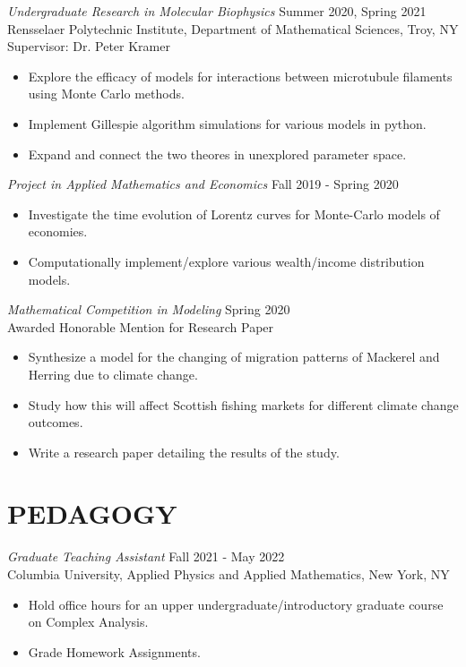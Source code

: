 \documentclass[margin]{rpires}
\begin{document}
\begin{resume}
    {\sl Undergraduate Research in Molecular Biophysics} \hfill Summer 2020, Spring 2021 \\
    Rensselaer Polytechnic Institute, 
    Department of Mathematical Sciences, Troy, NY\\
    Supervisor: Dr. Peter Kramer
    \begin{itemize}  \itemsep -2pt %
    \item Explore the efficacy of models for interactions between microtubule filaments using Monte Carlo methods.
    \item Implement Gillespie algorithm simulations for various models in python. 
    \item Expand and connect the two theores in unexplored parameter space.
    \end{itemize}

    {\sl Project in Applied Mathematics and Economics} \hfill Fall 2019 - Spring 2020
    \begin{itemize}  \itemsep -2pt %
        \item Investigate the time evolution of Lorentz curves for Monte-Carlo models of economies.
        \item Computationally implement/explore various wealth/income distribution models.
    \end{itemize}

    {\sl Mathematical Competition in Modeling} \hfill Spring 2020 \\
    Awarded Honorable Mention for Research Paper
    \begin{itemize}  \itemsep -2pt %
        \item Synthesize a model for the changing of migration patterns of Mackerel and Herring due to climate change.
        \item Study how this will affect Scottish fishing markets for different climate change outcomes.
        \item Write a research paper detailing the results of the study.
    \end{itemize}

\section{PEDAGOGY}
    {\sl Graduate Teaching Assistant} \hfill Fall 2021 - May 2022 \\
    Columbia University, Applied Physics and Applied Mathematics, New York, NY
    \begin{itemize}  \itemsep -2pt %
        \item Hold office hours for an upper undergraduate/introductory graduate course on Complex Analysis.
        \item Grade Homework Assignments. 
    \end{itemize}    



\end{resume}
\end{document}
